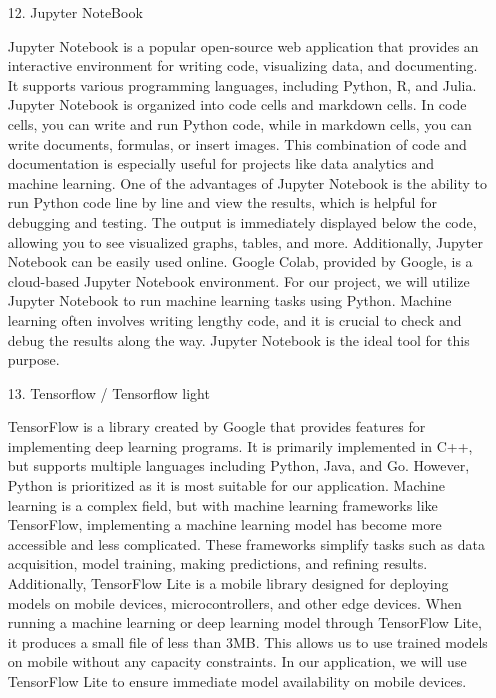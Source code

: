 \documentclass[conference, a4paper]{IEEEtran}
\begin{document}
\begin{enumerate}
\begin{enumerate}
        \item[12.]Jupyter NoteBook \cite{wikidocs-tutorial}
        \item[]Jupyter Notebook is a popular open-source web application that provides an interactive environment for writing code, visualizing data, and documenting. It supports various programming languages, including Python, R, and Julia. Jupyter Notebook is organized into code cells and markdown cells. In code cells, you can write and run Python code, while in markdown cells, you can write documents, formulas, or insert images. This combination of code and documentation is especially useful for projects like data analytics and machine learning. One of the advantages of Jupyter Notebook is the ability to run Python code line by line and view the results, which is helpful for debugging and testing. The output is immediately displayed below the code, allowing you to see visualized graphs, tables, and more. Additionally, Jupyter Notebook can be easily used online. Google Colab, provided by Google, is a cloud-based Jupyter Notebook environment. For our project, we will utilize Jupyter Notebook to run machine learning tasks using Python. Machine learning often involves writing lengthy code, and it is crucial to check and debug the results along the way. Jupyter Notebook is the ideal tool for this purpose.\\

        \item[13.]Tensorflow / Tensorflow light \cite{oracle-tensorflow}
        \item[]TensorFlow is a library created by Google that provides features for implementing deep learning programs. It is primarily implemented in C++, but supports multiple languages including Python, Java, and Go. However, Python is prioritized as it is most suitable for our application. Machine learning is a complex field, but with machine learning frameworks like TensorFlow, implementing a machine learning model has become more accessible and less complicated. These frameworks simplify tasks such as data acquisition, model training, making predictions, and refining results. Additionally, TensorFlow Lite is a mobile library designed for deploying models on mobile devices, microcontrollers, and other edge devices. When running a machine learning or deep learning model through TensorFlow Lite, it produces a small file of less than 3MB. This allows us to use trained models on mobile without any capacity constraints. In our application, we will use TensorFlow Lite to ensure immediate model availability on mobile devices.\\



\end{enumerate}
\end{enumerate}
\end{document}
